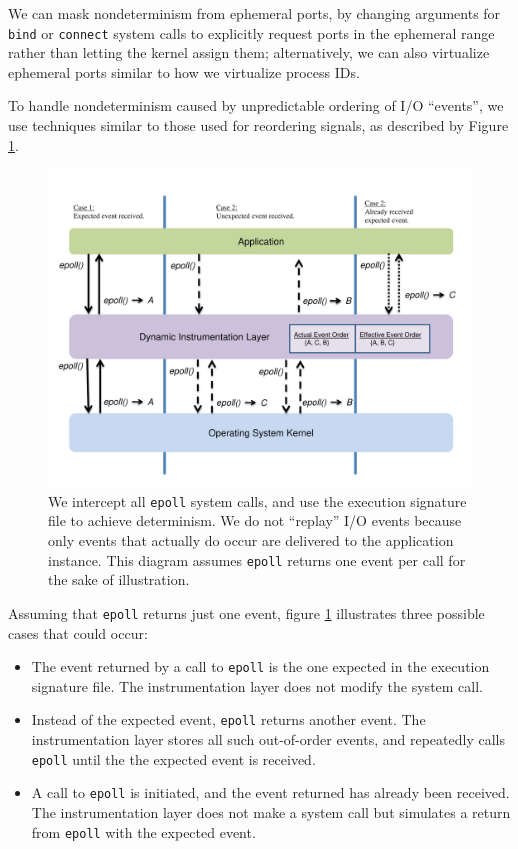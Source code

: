We can mask nondeterminism from ephemeral ports, 
by changing arguments for \texttt{bind} or \texttt{connect} 
system calls to explicitly request ports
in the ephemeral range rather than letting the kernel 
assign them; alternatively,
we can also virtualize ephemeral ports
similar to how we virtualize process IDs. \newline

\newpage
{} \newline
To handle nondeterminism caused by unpredictable
ordering of I/O ``events'',
we use techniques similar to those used 
for reordering signals,
as described by Figure \ref{ch3:reorderfig}.

\begin{figure}[h]
  \center
  \includegraphics[trim=0cm 0cm 0cm 0cm, scale=0.60]{epoll.pdf}
  \caption[Reordering I/O events using Pin]%
    {We intercept all \texttt{epoll} system calls,
    and use the execution signature file to
    achieve determinism. We do not ``replay'' I/O
    events because only events that actually do occur
    are delivered to the application instance. This
    diagram assumes \texttt{epoll} returns one event
    per call for the sake of illustration. }       
  \label{ch3:reorderfig}
\end{figure} 
              
Assuming that \texttt{epoll} returns just one event, figure
\ref{ch3:reorderfig} illustrates three possible cases that could occur:
\begin{itemize}
    \item The event returned by a call to \texttt{epoll} is the one expected
    in the execution signature file. The instrumentation layer
    does not modify the system call.
    \item Instead of the expected event,
    \texttt{epoll} returns another event.
    The instrumentation layer stores all such out-of-order events,
    and repeatedly calls \texttt{epoll} until the 
    the expected event is received.
    \item  A call to \texttt{epoll} is initiated, and the
    event returned has already been received.
    The instrumentation layer does not 
    make a system call but simulates a return
    from \texttt{epoll} with the expected event.
\end{itemize}

